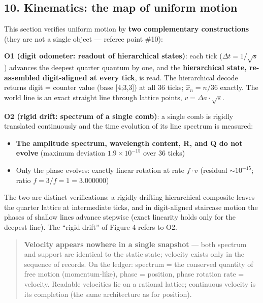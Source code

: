 \documentclass[
]{article}
\providecommand{\tightlist}{%
  \setlength{\itemsep}{0pt}\setlength{\parskip}{0pt}}
\begin{document}
\subsection{10. Kinematics: the map of uniform
motion}\label{kinematics-the-map-of-uniform-motion}

This section verifies uniform motion by \textbf{two complementary
constructions} (they are not a single object --- referee point \#10):

\textbf{O1 (digit odometer: readout of hierarchical states)}: each tick
(\(\Delta t=1/\sqrt s\)) advances the deepest quarter quantum by one,
and the \textbf{hierarchical state, re-assembled digit-aligned at every
tick}, is read. The hierarchical decode returns digit = counter value
(base {[}4;3,3{]}) at all 36 ticks; \(\hat x_n=n/36\) exactly. The world
line is an exact straight line through lattice points,
\(v=\Delta a\cdot\sqrt s\).

\textbf{O2 (rigid drift: spectrum of a single comb)}: a single comb is
rigidly translated continuously and the time evolution of its line
spectrum is measured:

\begin{itemize}
\tightlist
\item
  \textbf{The amplitude spectrum, wavelength content, R, and Q do not
  evolve} (maximum deviation \(1.9\times10^{-15}\) over 36 ticks)
\item
  Only the phase evolves: exactly linear rotation at rate \(f\cdot v\)
  (residual \(\sim10^{-15}\); ratio \(f{=}3/f{=}1=3.000000\))
\end{itemize}

The two are distinct verifications: a rigidly drifting hierarchical
composite leaves the quarter lattice at intermediate ticks, and in
digit-aligned staircase motion the phases of shallow lines advance
stepwise (exact linearity holds only for the deepest line). The ``rigid
drift'' of Figure 4 refers to O2.

\begin{quote}
\textbf{Velocity appears nowhere in a single snapshot} --- both
\textbar spectrum\textbar{} and support are identical to the static
state; velocity exists only in the sequence of records. On the ledger:
\textbar spectrum\textbar{} = the conserved quantity of free motion
(momentum-like), phase = position, phase rotation rate = velocity.
Readable velocities lie on a rational lattice; continuous velocity is
its completion (the same architecture as for position).
\end{quote}
\end{document}

